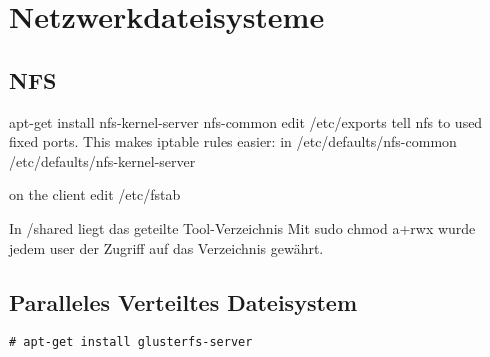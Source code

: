 \chapter{Netzwerkdateisysteme}
\section{NFS}
apt-get install nfs-kernel-server nfs-common
edit /etc/exports
tell nfs to used fixed ports. This makes iptable rules easier:
in /etc/defaults/nfs-common
/etc/defaults/nfs-kernel-server

on the client edit /etc/fstab

In /shared liegt das geteilte Tool-Verzeichnis
Mit sudo chmod a+rwx wurde jedem user der Zugriff auf das Verzeichnis gewährt.

\section{Paralleles Verteiltes Dateisystem}
\begin{lstlisting}[style=Bash]
# apt-get install glusterfs-server
\end{lstlisting}
